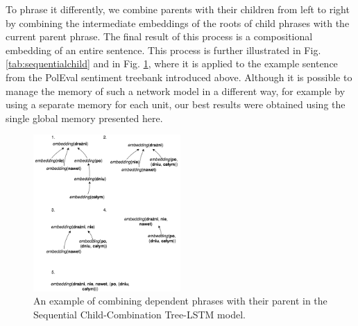 \documentclass[10pt, a4paper]{article}
\begin{document}
To phrase it differently, we combine parents with their children from left to right by combining the intermediate embeddings of the roots of child phrases with the current parent phrase. The final result of this process is a compositional embedding of an entire sentence. This process is further illustrated in Fig. \ref{tab:sequentialchild} and in Fig. \ref{tab:niedrazniex}, where it is applied to the example sentence from the PolEval sentiment treebank introduced above. Although it is possible to manage the memory of such a network model in a different way, for example by using a separate memory for each unit, our best results were obtained using the single global memory presented here.


\begin{figure}[h]
	\begin{center}
		\includegraphics[width=0.5\textwidth]{imgs/niedrazniex}
		\caption{An example of combining dependent phrases with their parent in the Sequential Child-Combination Tree-LSTM model.}
		\label{tab:niedrazniex}
	\end{center}
\end{figure}
	
\end{document}
